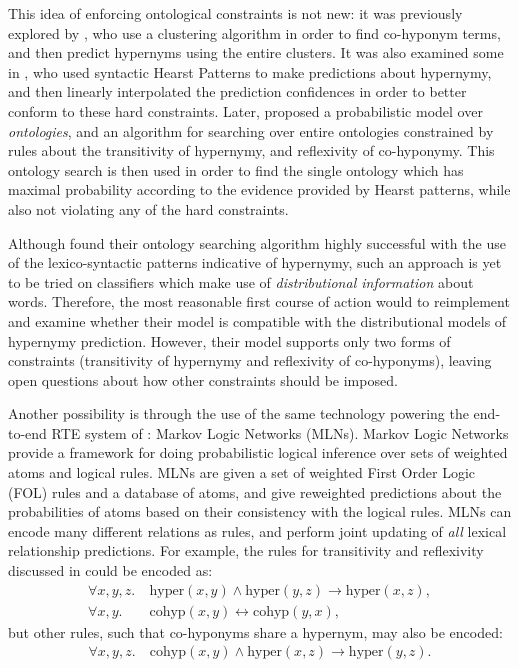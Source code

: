 \documentclass[12pt]{article}
\begin{document}
This idea of enforcing ontological constraints is not new: it was previously
explored by , who use a clustering algorithm in
order to find co-hyponym terms, and then predict hypernyms using the entire
clusters. It was also examined some in , who used
syntactic Hearst Patterns to make predictions about hypernymy, and then
linearly interpolated the prediction confidences in order to better
conform to these hard constraints. Later, 
proposed a probabilistic model over {\em ontologies}, and
an algorithm for searching over entire ontologies constrained by rules about
the transitivity of hypernymy, and reflexivity of co-hyponymy. This ontology
search is then used in order to find the single ontology which has maximal
probability according to the evidence provided by Hearst patterns, while also
not violating any of the hard constraints.

Although  found their ontology searching algorithm
highly successful with the use of the lexico-syntactic patterns indicative
of hypernymy, such an approach is yet to be tried on classifiers which make
use of {\em distributional information} about words. Therefore, the most reasonable
first course of action would to reimplement and examine whether their model
is compatible with the distributional models of hypernymy prediction.
However, their model supports only
two forms of constraints (transitivity of hypernymy and reflexivity of
co-hyponyms), leaving open questions about how other constraints should be
imposed.

Another possibility is through the use of the same technology powering the
end-to-end RTE system of : Markov Logic Networks
(MLNs).  Markov Logic Networks provide a framework for doing probabilistic
logical inference over sets of weighted atoms and logical rules. MLNs are given
a set of weighted First Order Logic (FOL) rules and a database of atoms, and
give reweighted predictions about the probabilities of atoms based on their
consistency with the logical rules. MLNs can encode many
different relations as rules, and perform joint updating of {\em all} lexical
relationship predictions.  For example, the rules for transitivity and reflexivity
discussed in  could be encoded as:
\begin{align*}
  \forall x,y,z. &~\text{hyper}(x,y) \wedge \text{hyper}(y, z) \rightarrow \text{hyper}(x, z),\\
  \forall x,y. &~\text{cohyp}(x,y) \leftrightarrow \text{cohyp}(y,x),
\end{align*}
but other rules, such that co-hyponyms share a hypernym, may also be encoded:
\begin{align*}
  \forall x,y,z. &~\text{cohyp}(x,y) \wedge \text{hyper}(x,z) \rightarrow \text{hyper}(y,z).
\end{align*}
\end{document}

